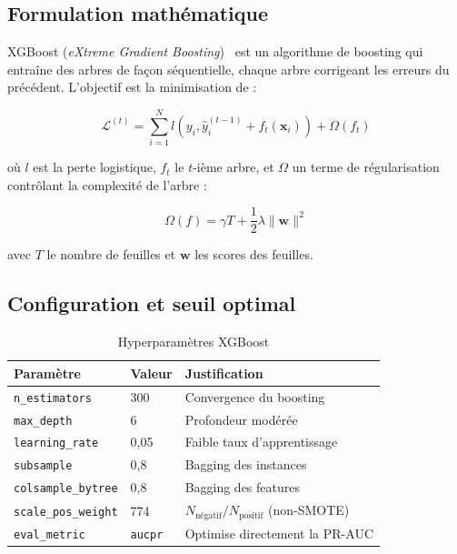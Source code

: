 \documentclass[12pt,a4paper,twoside]{report}
\theoremstyle{definition}
\begin{document}
\subsection{Formulation mathématique}

XGBoost (\textit{eXtreme Gradient Boosting})~\cite{chen2016xgboost} est un
algorithme de boosting qui entraîne des arbres de façon séquentielle, chaque
arbre corrigeant les erreurs du précédent. L'objectif est la minimisation de :

\begin{equation}
\mathcal{L}^{(t)} = \sum_{i=1}^{N} l(y_i, \hat{y}_i^{(t-1)} + f_t(\mathbf{x}_i))
+ \Omega(f_t)
\label{eq:xgb_obj}
\end{equation}

où $l$ est la perte logistique, $f_t$ le $t$-ième arbre, et $\Omega$ un terme
de régularisation contrôlant la complexité de l'arbre :

\begin{equation}
\Omega(f) = \gamma T + \frac{1}{2} \lambda \|\mathbf{w}\|^2
\label{eq:xgb_reg}
\end{equation}

avec $T$ le nombre de feuilles et $\mathbf{w}$ les scores des feuilles.

\subsection{Configuration et seuil optimal}

\begin{table}[H]
\centering
\caption{Hyperparamètres XGBoost}
\label{tab:xgb_params}
\renewcommand{\arraystretch}{1.3}
\begin{tabular}{lll}
\toprule
\textbf{Paramètre} & \textbf{Valeur} & \textbf{Justification} \\
\midrule
\texttt{n\_estimators}      & 300   & Convergence du boosting \\
\texttt{max\_depth}         & 6     & Profondeur modérée \\
\texttt{learning\_rate}     & 0,05  & Faible taux d'apprentissage \\
\texttt{subsample}          & 0,8   & Bagging des instances \\
\texttt{colsample\_bytree}  & 0,8   & Bagging des features \\
\texttt{scale\_pos\_weight} & 774   & $N_{\text{négatif}} / N_{\text{positif}}$ (non-SMOTE) \\
\texttt{eval\_metric}       & \texttt{aucpr} & Optimise directement la PR-AUC \\
\bottomrule
\end{tabular}
\end{table}
\end{document}
